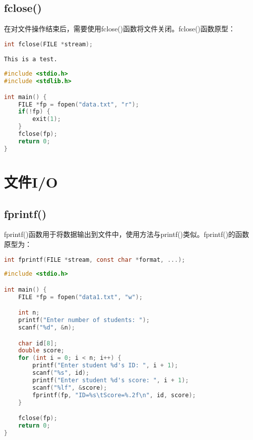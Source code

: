\vspace{0.5cm}

\subsection{fclose()}

在对文件操作结束后，需要使用fclose()函数将文件关闭。fclose()函数原型：

\vspace{-0.5cm}

\begin{lstlisting}[language=C]
int fclose(FILE *stream);
\end{lstlisting}

\vspace{0.5cm}


\begin{lstlisting}[title=data.txt]
This is a test.
\end{lstlisting}

\begin{lstlisting}[language=C, title=file.c]
#include <stdio.h>
#include <stdlib.h>

int main() {
    FILE *fp = fopen("data.txt", "r");
    if(!fp) {
        exit(1);
    }
    fclose(fp);
    return 0;
}
\end{lstlisting}

\newpage

\section{文件I/O}

\subsection{fprintf()}

fprintf()函数用于将数据输出到文件中，使用方法与printf()类似。fprintf()的函数原型为：

\vspace{-0.5cm}

\begin{lstlisting}[language=C]
int fprintf(FILE *stream, const char *format, ...);
\end{lstlisting}

\vspace{0.5cm}


\begin{lstlisting}[language=C]
#include <stdio.h>

int main() {
    FILE *fp = fopen("data1.txt", "w");

    int n;
    printf("Enter number of students: ");
    scanf("%d", &n);

    char id[8];
    double score;
    for (int i = 0; i < n; i++) {
        printf("Enter student %d's ID: ", i + 1);
        scanf("%s", id);
        printf("Enter student %d's score: ", i + 1);
        scanf("%lf", &score);
        fprintf(fp, "ID=%s\tScore=%.2f\n", id, score);
    }

    fclose(fp);
    return 0;
}
\end{lstlisting}

